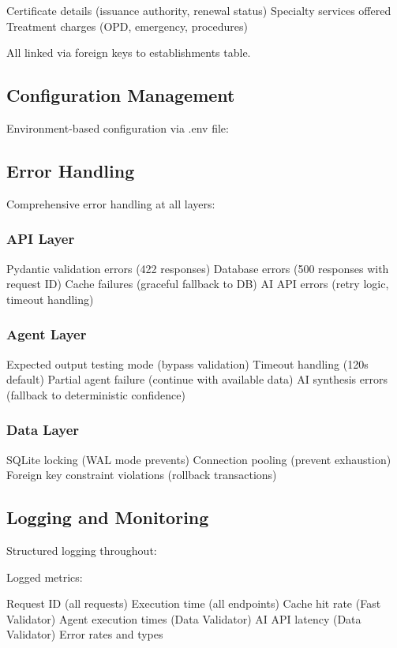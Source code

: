 \documentclass[conference]{IEEEtran}
\begin{document}
Certificate details (issuance authority, renewal status)
Specialty services offered
Treatment charges (OPD, emergency, procedures)

All linked via foreign keys to establishments table.

\subsection{Configuration Management}

Environment-based configuration via .env file:

\subsection{Error Handling}

Comprehensive error handling at all layers:

\subsubsection{API Layer}

Pydantic validation errors (422 responses)
Database errors (500 responses with request ID)
Cache failures (graceful fallback to DB)
AI API errors (retry logic, timeout handling)

\subsubsection{Agent Layer}

Expected output testing mode (bypass validation)
Timeout handling (120s default)
Partial agent failure (continue with available data)
AI synthesis errors (fallback to deterministic confidence)

\subsubsection{Data Layer}

SQLite locking (WAL mode prevents)
Connection pooling (prevent exhaustion)
Foreign key constraint violations (rollback transactions)

\subsection{Logging and Monitoring}

Structured logging throughout:

Logged metrics:

Request ID (all requests)
Execution time (all endpoints)
Cache hit rate (Fast Validator)
Agent execution times (Data Validator)
AI API latency (Data Validator)
Error rates and types
\end{document}
